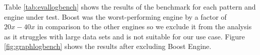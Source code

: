 {\renewcommand{\arraystretch}{1.2}%
\begin{table}[H]
\centering
\small
{}
\caption{Patterns Used in Log Benchmark and Number of Matches.}\label{tab:pattlogbench}
\end{table}
}

Table \ref{tab:evallogbench} shows the results of the benchmark for each pattern and engine under test. Boost was the worst-performing engine by a factor of $20x-40x$ in comparison to the other engines so we exclude it from the analysis as it struggles with large data sets and is not suitable for our use case. Figure \ref{fig:graphlogbench} shows the results after excluding Boost Engine.

